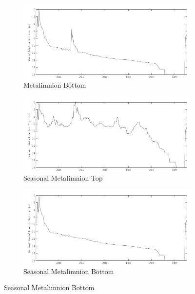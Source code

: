 \begin{figure}
\begin{subfigure}{\lafigsize}
  \end{subfigure}
  \begin{subfigure}{\lafigsize}
    \caption{\label{fig:la:out:metaB}Metalimnion Bottom}
    \includegraphics[width = \linewidth]{figures/Sparkling_metaB.pdf}
  \end{subfigure}
  \begin{subfigure}{\lafigsize}
    \caption{\label{fig:la:out:SmetaT}Seasonal Metalimnion Top}
    \includegraphics[width = \linewidth]{figures/Sparkling_SmetaT.pdf}
  \end{subfigure}
  \begin{subfigure}{\lafigsize}
    \caption{\label{fig:la:out:SmetaB}Seasonal Metalimnion Bottom}
    \includegraphics[width = \linewidth]{figures/Sparkling_SmetaB.pdf}
  \end{subfigure}

\end{figure}
